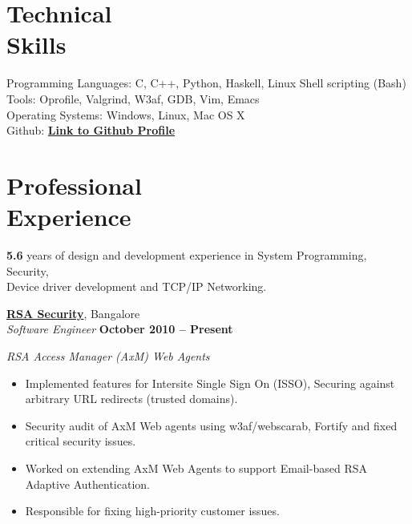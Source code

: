 \documentclass[a4paper,margin,line]{resume}
\begin{document}
\begin{resume}
	\section{\mysidestyle Technical\\Skills} 
	
	Programming Languages: C, C++, Python, Haskell, Linux Shell scripting (Bash) \vspace{2mm}\\%
	Tools: Oprofile, Valgrind, W3af, GDB, Vim, Emacs \vspace{2mm}\\%
	Operating Systems: Windows, Linux, Mac OS X \vspace*{2mm}\\%
	Github:  \href{https://github.com/niranjan-nagaraju/}{\textbf{Link to Github Profile}}


    \section{\mysidestyle Professional\\Experience}
    
    \textbf{5.6} years of design and development experience in System Programming, Security,\\ 
	Device driver development and TCP/IP Networking.

    \href{http://www.rsa.com/}{\textbf{RSA Security}}, Bangalore \vspace{2mm}\\\vspace{1mm}%
    \textsl{Software Engineer} \hfill \textbf{October 2010 -- Present}%

	\textsl{RSA Access Manager (AxM) Web Agents}
	\begin{itemize}
		\item Implemented features for Intersite Single Sign On (ISSO), Securing against arbitrary URL redirects (trusted domains).%
		\item Security audit of AxM Web agents using w3af/webscarab, Fortify and fixed critical security issues. %
		\item Worked on extending AxM Web Agents to support Email-based RSA Adaptive Authentication. %
		\item Responsible for fixing high-priority customer issues. \vspace{0mm}\\\vspace{1mm}%
	\end{itemize}



\end{resume}
\end{document}

